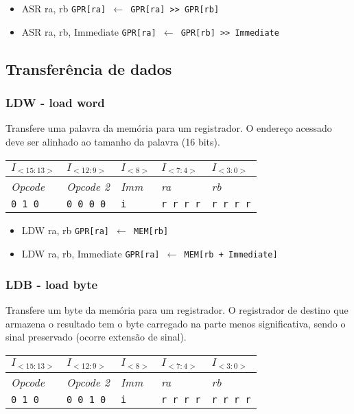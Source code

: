 \documentclass[11pt,a4paper]{report}
\begin{document}
\begin{itemize}
\item ASR ra, rb
\subitem \texttt{GPR[ra] $\leftarrow$ GPR[ra] >> GPR[rb]}
\item ASR ra, rb, Immediate
\subitem \texttt{GPR[ra] $\leftarrow$ GPR[rb] >> Immediate}
\end{itemize}


\subsection{Transferência de dados}

\subsubsection{LDW - load word}

Transfere uma palavra da memória para um registrador. O endereço acessado
deve ser alinhado ao tamanho da palavra (16 bits).

\begin{table}[htb!]
\centering
\begin{tabular}{|p{2cm}|p{2cm}|p{2cm}|p{2cm}|p{2cm}|}
\hline
$I_{<15:13>}$ & $I_{<12:9>}$ & $I_{<8>}$ & $I_{<7:4>}$ & $I_{<3:0>}$  \\ \hline
\textit{Opcode} & \textit{Opcode 2} & \textit{Imm} & \textit{ra} & \textit{rb} \\ \hline
\texttt{0 1 0} & \texttt{0 0 0 0} & \texttt{i} & \texttt{r r r r} & \texttt{r r r r} \\ \hline
\end{tabular}
\end{table}

\begin{itemize}
\item LDW ra, rb
\subitem \texttt{GPR[ra] $\leftarrow$ MEM[rb]}
\item LDW ra, rb, Immediate
\subitem \texttt{GPR[ra] $\leftarrow$ MEM[rb + Immediate]}
\end{itemize}

\subsubsection{LDB - load byte}

Transfere um byte da memória para um registrador. O registrador de
destino que armazena o resultado tem o byte carregado na parte menos
significativa, sendo o sinal preservado (ocorre extensão de sinal).

\begin{table}[htb!]
\centering
\begin{tabular}{|p{2cm}|p{2cm}|p{2cm}|p{2cm}|p{2cm}|}
\hline
$I_{<15:13>}$ & $I_{<12:9>}$ & $I_{<8>}$ & $I_{<7:4>}$ & $I_{<3:0>}$  \\ \hline
\textit{Opcode} & \textit{Opcode 2} & \textit{Imm} & \textit{ra} & \textit{rb} \\ \hline
\texttt{0 1 0} & \texttt{0 0 1 0} & \texttt{i} & \texttt{r r r r} & \texttt{r r r r} \\ \hline
\end{tabular}
\end{table}
\end{document}
